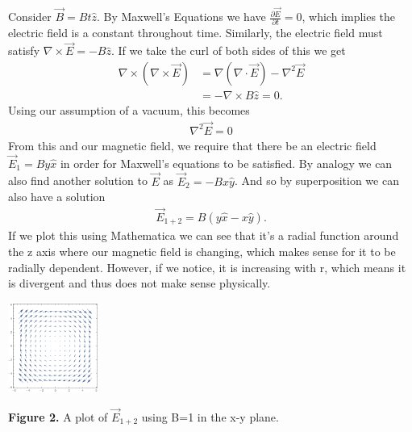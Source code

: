 \documentclass[landscape,a0paper,fontscale=0.285]{baposter} %
\begin{document}
\begin{poster}
{\begin{multicols}{3}
Consider $\vec{B} = Bt \hat{z}$. By Maxwell's Equations we have $\frac{\partial \vec{E}}{\partial t} = 0$, which implies the electric field is a constant throughout time. Similarly, the electric field must satisfy $\nabla \times \vec{E} = -B \hat{z}$. If we take the curl of both sides of this we get
\begin{align*}
\nabla \times(\nabla \times \vec{E}) &= \nabla (\nabla \cdot \vec{E})- \nabla^2 \vec{E} \\ &= -\nabla \times B \hat{z} =0.
\end{align*}
Using our assumption of a vacuum, this becomes 
\begin{align*}
\nabla^2 \vec{E} =  0 \label{del^2 E=0}
\end{align*}
From this and our magnetic field, we require that there be an electric field $\vec{E}_1=By \hat{x}$ in order for Maxwell's equations to be satisfied. By analogy we can also find another solution to $\vec{E}$ as $\vec{E}_2 = -Bx\hat{y}$. And so by superposition we can also have a solution
\begin{align}
\vec{E}_{1+2} = B(y \hat{x}-x\hat{y}).
\end{align}
If we plot this using Mathematica we can see that it's a radial function around the z axis where our magnetic field is changing, which makes sense for it to be radially dependent. However, if we notice, it is increasing with r, which means it is divergent and thus does not make sense physically.

\begin{center}
	\includegraphics[width=0.22\textwidth]{E1plus2.png}
	
	{\footnotesize \textbf{Figure 2.} A plot of $\vec{E}_{1+2}$ using B=1 in the x-y plane.}
\end{center}
\end{multicols}
}


\end{poster}
\end{document}

